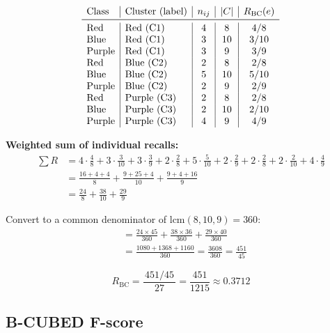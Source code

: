 \documentclass[11pt, a4paper]{article}
\begin{document}
\[
\begin{array}{l|l|c|c|c}
\text{Class} & \text{Cluster (label)} & n_{ij} & |C| & R_{\mathrm{BC}}(e) \\
\midrule
\text{Red}    & \text{Red (C1)}    & 4 &  8 & 4/8  \\
\text{Blue}   & \text{Red (C1)}    & 3 & 10 & 3/10 \\
\text{Purple} & \text{Red (C1)}    & 3 &  9 & 3/9  \\
\text{Red}    & \text{Blue (C2)}   & 2 &  8 & 2/8  \\
\text{Blue}   & \text{Blue (C2)}   & 5 & 10 & 5/10 \\
\text{Purple} & \text{Blue (C2)}   & 2 &  9 & 2/9  \\
\text{Red}    & \text{Purple (C3)} & 2 &  8 & 2/8  \\
\text{Blue}   & \text{Purple (C3)} & 2 & 10 & 2/10 \\
\text{Purple} & \text{Purple (C3)} & 4 &  9 & 4/9  \\
\end{array}
\]

\textbf{Weighted sum of individual recalls:}
\begin{align*}
  \textstyle\sum R
  &= 4{\cdot}\tfrac{4}{8}
   + 3{\cdot}\tfrac{3}{10}
   + 3{\cdot}\tfrac{3}{9}
   + 2{\cdot}\tfrac{2}{8}
   + 5{\cdot}\tfrac{5}{10}
   + 2{\cdot}\tfrac{2}{9}
   + 2{\cdot}\tfrac{2}{8}
   + 2{\cdot}\tfrac{2}{10}
   + 4{\cdot}\tfrac{4}{9} \\[4pt]
  &= \frac{16+4+4}{8} + \frac{9+25+4}{10} + \frac{9+4+16}{9} \\[4pt]
  &= \frac{24}{8} + \frac{38}{10} + \frac{29}{9}
\end{align*}

Convert to a common denominator of $\mathrm{lcm}(8,10,9) = 360$:
\begin{align*}
  &= \frac{24 \times 45}{360} + \frac{38 \times 36}{360} + \frac{29 \times 40}{360} \\[4pt]
  &= \frac{1080 + 1368 + 1160}{360}
   = \frac{3608}{360}
   = \frac{451}{45}
\end{align*}

\begin{mathbox}
\[
  R_{\mathrm{BC}}
  = \frac{\,451/45\,}{27}
  = \frac{451}{1215}
  \approx 0.3712
\]
\end{mathbox}

\subsection{B-CUBED F-score}
\end{document}
